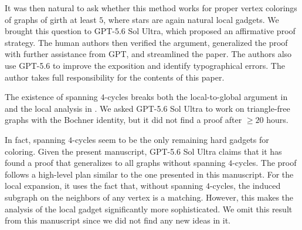 \documentclass[a4paper,12pt]{article}
\theoremstyle{plain}
\theoremstyle{definition}
\begin{document}
It was then natural to ask whether this method works for proper vertex
colorings of graphs of girth at least $5$, where stars are again natural
local gadgets.
We brought this question to GPT-5.6 Sol Ultra, which proposed an affirmative
proof strategy.  The human authors then verified the argument, generalized
the proof with further assistance from GPT, and streamlined the paper.
The authors also use GPT-5.6 to improve the exposition and
identify typographical errors. The author takes full responsibility for the contents of this paper.

\begin{remark}
  The existence of spanning $4$-cycles breaks both the local-to-global argument in  and the local analysis in .
  We asked GPT-5.6 Sol Ultra to work on triangle-free graphs with the Bochner identity, but it did not find a proof after $\geq 20$ hours.

  In fact, spanning $4$-cycles seem to be the only remaining hard gadgets for coloring.
  Given the present manuscript, GPT-5.6 Sol Ultra claims that it has found a proof that generalizes  to all graphs without spanning $4$-cycles.
  The proof follows a high-level plan similar to the one presented in this manuscript. For the local expansion, it uses the fact that, without spanning $4$-cycles, the induced subgraph on the neighbors of any vertex is a matching.
  However, this makes the analysis of the local gadget significantly more sophisticated.
  We omit this result from this manuscript since we did not find any new ideas in it.
\end{remark}

\end{document}
